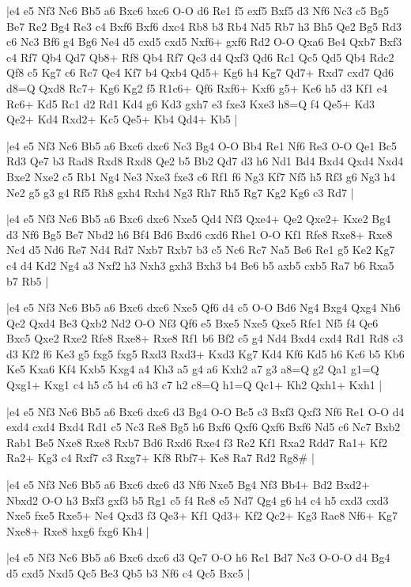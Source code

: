\whitename{}
\blackname{}
\makegametitle
|e4 e5 Nf3 Nc6 Bb5 a6 Bxc6 bxc6 O-O d6 Re1 f5 exf5 Bxf5 d3 Nf6 Nc3 c5 Bg5 Be7 Re2 Bg4 Re3 c4 Bxf6 Bxf6 dxc4 Rb8 b3 Rb4 Nd5 Rb7 h3 Bh5 Qe2 Bg5 Rd3 c6 Nc3 Bf6 g4 Bg6 Ne4 d5 cxd5 cxd5 Nxf6+ gxf6 Rd2 O-O Qxa6 Be4 Qxb7 Bxf3 c4 Rf7 Qb4 Qd7 Qb8+ Rf8 Qb4 Rf7 Qc3 d4 Qxf3 Qd6 Rc1 Qc5 Qd5 Qb4 Rdc2 Qf8 c5 Kg7 c6 Rc7 Qe4 Kf7 b4 Qxb4 Qd5+ Kg6 h4 Kg7 Qd7+ Rxd7 cxd7 Qd6 d8=Q Qxd8 Rc7+ Kg6 Kg2 f5 R1c6+ Qf6 Rxf6+ Kxf6 g5+ Ke6 h5 d3 Kf1 e4 Rc6+ Kd5 Rc1 d2 Rd1 Kd4 g6 Kd3 gxh7 e3 fxe3 Kxe3 h8=Q f4 Qe5+ Kd3 Qe2+ Kd4 Rxd2+ Kc5 Qe5+ Kb4 Qd4+ Kb5  |

\whitename{}
\blackname{}
\makegametitle
|e4 e5 Nf3 Nc6 Bb5 a6 Bxc6 dxc6 Nc3 Bg4 O-O Bb4 Re1 Nf6 Re3 O-O Qe1 Bc5 Rd3 Qe7 b3 Rad8 Rxd8 Rxd8 Qe2 b5 Bb2 Qd7 d3 h6 Nd1 Bd4 Bxd4 Qxd4 Nxd4 Bxe2 Nxe2 c5 Rb1 Ng4 Ne3 Nxe3 fxe3 c6 Rf1 f6 Ng3 Kf7 Nf5 h5 Rf3 g6 Ng3 h4 Ne2 g5 g3 g4 Rf5 Rh8 gxh4 Rxh4 Ng3 Rh7 Rh5 Rg7 Kg2 Kg6 c3 Rd7  |

\whitename{}
\blackname{}
\makegametitle
|e4 e5 Nf3 Nc6 Bb5 a6 Bxc6 dxc6 Nxe5 Qd4 Nf3 Qxe4+ Qe2 Qxe2+ Kxe2 Bg4 d3 Nf6 Bg5 Be7 Nbd2 h6 Bf4 Bd6 Bxd6 cxd6 Rhe1 O-O Kf1 Rfe8 Rxe8+ Rxe8 Nc4 d5 Nd6 Re7 Nd4 Rd7 Nxb7 Rxb7 b3 c5 Nc6 Rc7 Na5 Be6 Re1 g5 Ke2 Kg7 c4 d4 Kd2 Ng4 a3 Nxf2 h3 Nxh3 gxh3 Bxh3 b4 Be6 b5 axb5 cxb5 Ra7 b6 Rxa5 b7 Rb5  |

\whitename{}
\blackname{}
\makegametitle
|e4 e5 Nf3 Nc6 Bb5 a6 Bxc6 dxc6 Nxe5 Qf6 d4 c5 O-O Bd6 Ng4 Bxg4 Qxg4 Nh6 Qe2 Qxd4 Be3 Qxb2 Nd2 O-O Nf3 Qf6 e5 Bxe5 Nxe5 Qxe5 Rfe1 Nf5 f4 Qe6 Bxc5 Qxe2 Rxe2 Rfe8 Rxe8+ Rxe8 Rf1 b6 Bf2 c5 g4 Nd4 Bxd4 cxd4 Rd1 Rd8 c3 d3 Kf2 f6 Ke3 g5 fxg5 fxg5 Rxd3 Rxd3+ Kxd3 Kg7 Kd4 Kf6 Kd5 h6 Kc6 b5 Kb6 Ke5 Kxa6 Kf4 Kxb5 Kxg4 a4 Kh3 a5 g4 a6 Kxh2 a7 g3 a8=Q g2 Qa1 g1=Q Qxg1+ Kxg1 c4 h5 c5 h4 c6 h3 c7 h2 c8=Q h1=Q Qc1+ Kh2 Qxh1+ Kxh1  |

\whitename{}
\blackname{}
\makegametitle
|e4 e5 Nf3 Nc6 Bb5 a6 Bxc6 dxc6 d3 Bg4 O-O Bc5 c3 Bxf3 Qxf3 Nf6 Re1 O-O d4 exd4 cxd4 Bxd4 Rd1 c5 Nc3 Re8 Bg5 h6 Bxf6 Qxf6 Qxf6 Bxf6 Nd5 c6 Nc7 Bxb2 Rab1 Be5 Nxe8 Rxe8 Rxb7 Bd6 Rxd6 Rxe4 f3 Re2 Kf1 Rxa2 Rdd7 Ra1+ Kf2 Ra2+ Kg3 c4 Rxf7 c3 Rxg7+ Kf8 Rbf7+ Ke8 Ra7 Rd2 Rg8\#  |

\whitename{}
\blackname{}
\makegametitle
|e4 e5 Nf3 Nc6 Bb5 a6 Bxc6 dxc6 d3 Nf6 Nxe5 Bg4 Nf3 Bb4+ Bd2 Bxd2+ Nbxd2 O-O h3 Bxf3 gxf3 b5 Rg1 c5 f4 Re8 e5 Nd7 Qg4 g6 h4 c4 h5 cxd3 cxd3 Nxe5 fxe5 Rxe5+ Ne4 Qxd3 f3 Qe3+ Kf1 Qd3+ Kf2 Qc2+ Kg3 Rae8 Nf6+ Kg7 Nxe8+ Rxe8 hxg6 fxg6 Kh4  |

\whitename{}
\blackname{}
\makegametitle
|e4 e5 Nf3 Nc6 Bb5 a6 Bxc6 dxc6 d3 Qe7 O-O h6 Re1 Bd7 Nc3 O-O-O d4 Bg4 d5 cxd5 Nxd5 Qc5 Be3 Qb5 b3 Nf6 c4 Qc5 Bxc5  |

